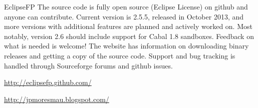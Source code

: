 \begin{hcarentry}[updated]{EclipseFP}
The source code is fully open source (Eclipse License) on github and anyone can contribute. Current version is 2.5.5, released in October 2013, and more versions with additional features are planned and actively worked on. Most notably, version 2.6 should include support for Cabal 1.8 sandboxes. Feedback on what is needed is welcome! The website has information on downloading binary releases and getting a copy of the source code. Support and bug tracking is handled through Sourceforge forums and github issues. 

\FurtherReading
\begin{compactitem}
\item \url{http://eclipsefp.github.com/}
\item \url{http://jpmoresmau.blogspot.com/}
\end{compactitem}
\end{hcarentry}
